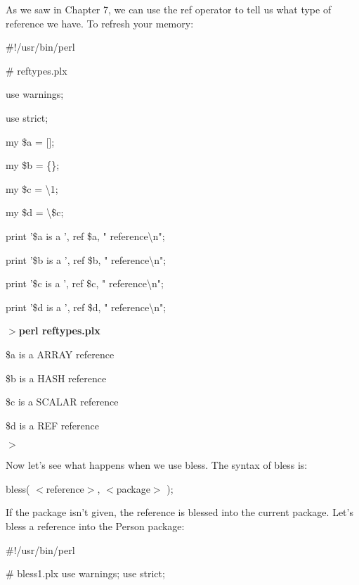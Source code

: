 \documentclass[a4paper,11pt]{book}
\begin{document}
\noindent As we saw in Chapter 7, we can use the ref operator to tell us what type of reference we have. To refresh your memory:

\noindent 

\noindent \#!/usr/bin/perl

\noindent \# reftypes.plx

\noindent use warnings;

\noindent use strict;

\noindent 

\noindent my \$a = [];

\noindent my \$b = \{\};

\noindent my \$c = \textbackslash 1;

\noindent my \$d = \textbackslash \$c;

\noindent print '\$a is a ', ref \$a, " reference\textbackslash n";

\noindent print '\$b is a ', ref \$b, " reference\textbackslash n";

\noindent print '\$c is a ', ref \$c, " reference\textbackslash n";

\noindent print '\$d is a ', ref \$d, " reference\textbackslash n";

\noindent 

\noindent 

\noindent $>$\textbf{perl reftypes.plx}

\noindent \$a is a ARRAY reference

\noindent \$b is a HASH reference

\noindent \$c is a SCALAR reference

\noindent \$d is a REF reference

\noindent $>$

\noindent 

\noindent Now let's see what happens when we use bless. The syntax of bless is:

\noindent 

\noindent 

\noindent bless( $<$reference$>$, $<$package$>$ );

\noindent 

\noindent If the package isn't given, the reference is blessed into the current package. Let's bless a reference into the Person package:

\noindent 

\noindent \#!/usr/bin/perl

\noindent \# bless1.plx use warnings; use strict;
\end{document}
